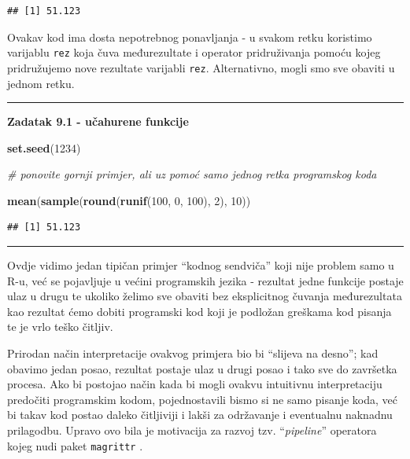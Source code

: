 \documentclass[]{book}
\newenvironment{Shaded}{\begin{snugshade}}{\end{snugshade}}
\newcommand{\KeywordTok}[1]{\textcolor[rgb]{0.13,0.29,0.53}{\textbf{#1}}}
\newcommand{\DecValTok}[1]{\textcolor[rgb]{0.00,0.00,0.81}{#1}}
\newcommand{\CommentTok}[1]{\textcolor[rgb]{0.56,0.35,0.01}{\textit{#1}}}
\newcommand{\NormalTok}[1]{#1}
\theoremstyle{definition}
\theoremstyle{definition}
\theoremstyle{definition}
\theoremstyle{remark}
\begin{document}
\begin{verbatim}
## [1] 51.123
\end{verbatim}

Ovakav kod ima dosta nepotrebnog ponavljanja - u svakom retku koristimo
varijablu \texttt{rez} koja čuva međurezultate i operator pridruživanja
pomoću kojeg pridružujemo nove rezultate varijabli \texttt{rez}.
Alternativno, mogli smo sve obaviti u jednom retku.

\begin{center}\rule{0.5\linewidth}{\linethickness}\end{center}

\textbf{Zadatak 9.1 - učahurene funkcije}

\begin{Shaded}
\begin{Highlighting}[]
\KeywordTok{set.seed}\NormalTok{(}\DecValTok{1234}\NormalTok{)}

\CommentTok{# ponovite gornji primjer, ali uz pomoć samo jednog retka programskog koda}
\end{Highlighting}
\end{Shaded}

\begin{Shaded}
\begin{Highlighting}[]
\KeywordTok{mean}\NormalTok{(}\KeywordTok{sample}\NormalTok{(}\KeywordTok{round}\NormalTok{(}\KeywordTok{runif}\NormalTok{(}\DecValTok{100}\NormalTok{, }\DecValTok{0}\NormalTok{, }\DecValTok{100}\NormalTok{), }\DecValTok{2}\NormalTok{), }\DecValTok{10}\NormalTok{))}
\end{Highlighting}
\end{Shaded}

\begin{verbatim}
## [1] 51.123
\end{verbatim}

\begin{center}\rule{0.5\linewidth}{\linethickness}\end{center}

Ovdje vidimo jedan tipičan primjer ``kodnog sendviča'' koji nije problem
samo u R-u, već se pojavljuje u većini programskih jezika - rezultat
jedne funkcije postaje ulaz u drugu te ukoliko želimo sve obaviti bez
eksplicitnog čuvanja međurezultata kao rezultat ćemo dobiti programski
kod koji je podložan greškama kod pisanja te je vrlo teško čitljiv.

Prirodan način interpretacije ovakvog primjera bio bi ``slijeva na
desno''; kad obavimo jedan posao, rezultat postaje ulaz u drugi posao i
tako sve do završetka procesa. Ako bi postojao način kada bi mogli
ovakvu intuitivnu interpretaciju predočiti programskim kodom,
pojednostavili bismo si ne samo pisanje koda, već bi takav kod postao
daleko čitljiviji i lakši za održavanje i eventualnu naknadnu
prilagodbu. Upravo ovo bila je motivacija za razvoj tzv.
``\emph{pipeline}'' operatora kojeg nudi paket \texttt{magrittr}
\citep{R-magrittr}.
\end{document}
